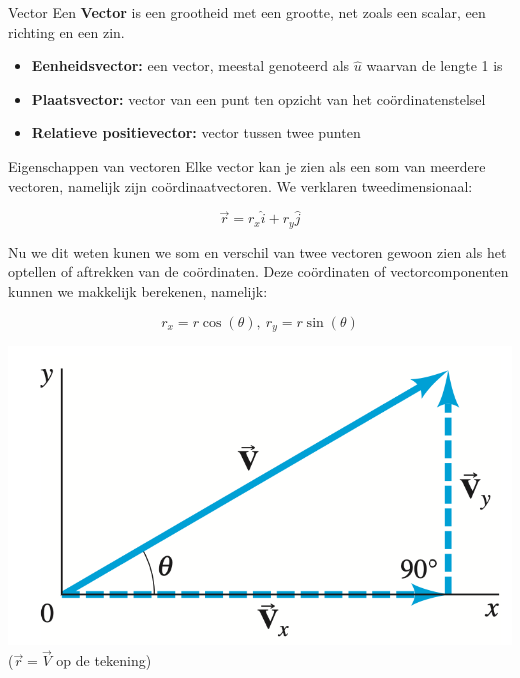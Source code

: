 \begin{theo}[Vector]{Vector}
    Een \textbf{Vector} is een grootheid met een grootte, net zoals een scalar, een richting en een zin.
    \begin{itemize}
        \item \textbf{Eenheidsvector:} een vector, meestal genoteerd als $ \hat{u} $ waarvan de lengte 1 is
        \item \textbf{Plaatsvector:} vector van een punt ten opzicht van het coördinatenstelsel
        \item \textbf{Relatieve positievector:} vector tussen twee punten
    \end{itemize}
\end{theo}

\begin{pro}{Eigenschappen van vectoren}
    Elke vector kan je zien als een som van meerdere vectoren, namelijk zijn coördinaatvectoren. We verklaren tweedimensionaal:
    
    \begin{equation*}
        \Vec{r} = r_x\hat{i} + r_y\hat{j}
    \end{equation*}

    \noindent Nu we dit weten kunen we som en verschil van twee vectoren gewoon zien als het optellen of aftrekken van de coördinaten. Deze coördinaten of vectorcomponenten kunnen we makkelijk berekenen, namelijk: 

    \begin{equation*}
        r_x = r\cos(\theta),\ r_y = r\sin(\theta)
    \end{equation*}
    
    \begin{center}
        \includegraphics[scale = 0.4]{Images/Inleiding/Vectorcomponenten.png}
        \\
        ($\Vec{r} = \Vec{V}$ op de tekening)
    \end{center}
    

\end{pro}
